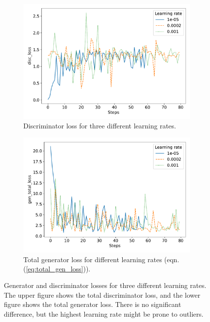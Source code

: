 \begin{figure}
	\centering
	\begin{subfigure}{\linewidth}
		\centering
		\includegraphics[width=\textwidth]{fig/analysis/Plot_learning_rate_disc_loss.pdf}
		\caption{Discriminator loss for three different learning rates. }
		\label{fig:Plot_learning_rate_discloss}
	\end{subfigure}\hfill
	\begin{subfigure}{\linewidth}
		\centering
		\includegraphics[width=\textwidth]{fig/analysis/Plot_learning_rate_gen_total_loss.pdf}
		\caption{Total generator loss for different learning rates (eqn. (\ref{eq:total_gen_loss})).}
		\label{fig:Plot_learning_rate_genloss}
	\end{subfigure}\hfill
	\caption{Generator and discriminator losses for three different learning rates. The upper figure shows the total discriminator loss, and the lower figure shows the total generator loss. There is no significant difference, but the highest learning rate might be prone to outliers. }
	\label{fig:Plot_learning_rate_loss}
\end{figure}
